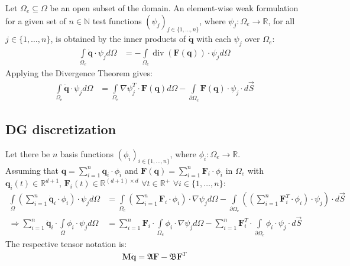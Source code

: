\documentclass{IOS-Book-Article}
\theoremstyle{plain}
\theoremstyle{definition}
\DeclareMathOperator{\diverg}{div}
\begin{document}
Let $\Omega_e \subseteq \Omega$ be an open subset of the domain.
An element-wise weak formulation for a given set of $n \in \mathbb{N}$ test functions $(\psi_j)_{j \in \{1, \dots , n\}}$, where $\psi_j : \Omega_e \rightarrow \mathbb{R}$, for all $j \in \{1, \dots , n\}$, is obtained by the inner products of $\dot{\mathbf q}$ with each $\psi_j$ over $\Omega_e$:
\begin{align}
	\int \limits_{\Omega_e} \dot{\mathbf q} \cdot \psi_j d\Omega &= - \int \limits_{\Omega_e} \diverg (\mathbf F(\mathbf q)) \cdot \psi_j d\Omega
\end{align}
Applying the Divergence Theorem gives:
\begin{align}
	\int \limits_{\Omega_e} \dot{\mathbf q} \cdot \psi_j d\Omega &= \int \limits_{\Omega_e} \nabla \psi_j^T \cdot \mathbf F(\mathbf q) d\Omega - \int \limits_{\partial \Omega_e} \mathbf F(\mathbf q) \cdot \psi_j \cdot d \vec{S}
	\label{eqn:swe_weak_form}
\end{align}

\subsection{DG discretization}

Let there be $n$ basis functions $(\phi_i)_{i \in \{1, \dots , n\}}$, where $\phi_i : \Omega_e \rightarrow \mathbb{R}$.\\
Assuming that $\mathbf q = \sum \limits_{i = 1}^{n} \mathbf q_i \cdot \phi_i$ and $\mathbf F(\mathbf q) = \sum \limits_{i = 1}^{n} \mathbf F_i \cdot \phi_i$ in  $\Omega_e$ with $\mathbf q_i(t) \in \mathbb{R}^{d + 1}$, $\mathbf F_i(t) \in \mathbb R^{(d+1) \times d}$ $\forall t \in \mathbb{R}^{+}$ $\forall i \in \{1, \dots , n\}$:
\begin{align}
	\int \limits_{\Omega} (\sum \limits_{i = 1}^{n} \dot{\mathbf q}_i \cdot \phi_i) \cdot \psi_j d\Omega &= \int \limits_{\Omega_e} (\sum \limits_{i = 1}^{n} \mathbf F_i \cdot \phi_i) \cdot \nabla \psi_j d\Omega - \int \limits_{\partial \Omega_e} ((\sum \limits_{i = 1}^{n} \mathbf F^T_i \cdot \phi_i) \cdot \psi_j) \cdot d \vec{S}\\
	\Rightarrow \sum \limits_{i = 1}^{n} \dot{\mathbf q}_i \cdot \int \limits_{\Omega} \phi_i \cdot \psi_j d\Omega &= \sum \limits_{i = 1}^{n} \mathbf F_i \cdot \int \limits_{\Omega_e} \phi_i \cdot \nabla \psi_j d\Omega - \sum \limits_{i = 1}^{n} \mathbf F^T_i \cdot \int \limits_{\partial \Omega_e} \phi_i \cdot \psi_j \cdot d \vec{S}
\end{align}
The respective tensor notation is:
\begin{align}
	\mathbf M \mathbf{\dot q} = \mathfrak A \mathbf{F} - \mathfrak B \mathbf{F}^T
	\label{eqn:heq_fem_matrix_form}
\end{align}
\end{document}
